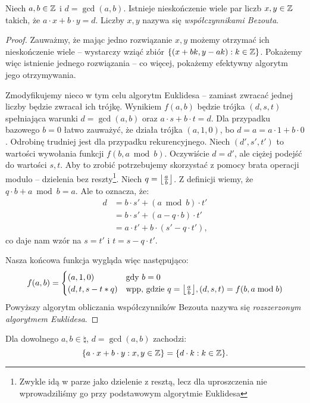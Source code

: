 \begin{theorem}
	\label{nt:bezout}
	Niech \(a, b \in \mathbb{Z}\) i \(d = \gcd(a, b)\). Istnieje nieskończenie
	wiele par liczb \(x, y \in \mathbb{Z}\) takich, że \(a \cdot x + b \cdot y = d\).
	Liczby \(x, y\) nazywa się \textit{współczynnikami Bezouta}.
\end{theorem}
\begin{proof}
	Zauważmy, że mając jedno rozwiązanie \(x, y\) możemy otrzymać ich nieskończenie wiele --
	wystarczy wziąć zbiór \(\set{(x+bk, y-ak) : k \in \integer}\). Pokażemy więc istnienie jednego
	rozwiązania -- co więcej, pokażemy efektywny algorytm jego otrzymywania.

	Zmodyfikujemy nieco w tym celu algorytm Euklidesa -- zamiast zwracać jednej liczby będzie zwracał ich trójkę.
	Wynikiem \(f(a, b)\) będzie trójka \((d, s, t)\) spełniająca warunki \(d = \gcd(a, b)\) oraz \(a \cdot s + b \cdot t = d\).
	Dla przypadku bazowego \(b = 0\) łatwo zauważyć, że działa trójka \((a, 1, 0)\), bo \(d = a = a \cdot 1 + b \cdot 0\).
	Odrobinę trudniej jest dla przypadku rekurencyjnego. Niech \((d', s', t')\) to wartości wywołania funkcji
	\(f(b, a \bmod b)\). Oczywiście \(d = d'\), ale ciężej podejść do wartości \(s, t\). Aby to zrobić potrzebujemy
	skorzystać z pomocy brata operacji modulo -- dzielenia bez reszty\footnote{Zwykle idą w parze jako dzielenie z resztą, lecz dla uproszczenia nie wprowadziliśmy go przy podstawowym algorytmie Euklidesa}.
	Niech \(q = \left\lfloor\frac{a}{b}\right\rfloor\). Z definicji wiemy, że \(q \cdot b + a \bmod b = a\). Ale to oznacza, że:
	\begin{align*}
		d & = b \cdot s' + (a \bmod b) \cdot t'       \\
		  & = b \cdot s' + (a - q \cdot b) \cdot t'   \\
		  & = a \cdot t' + b \cdot (s' - q \cdot t'),
	\end{align*}
	co daje nam wzór na \(s = t'\) i \(t = s - q \cdot t'\).

	Nasza końcowa funkcja wygląda więc następująco:
	\begin{equation*}
		f(a, b) = \begin{cases}
			(a, 1, 0)         & \text{gdy } b = 0                                                        \\
			(d, t, s - t * q) & \text {wpp, gdzie } q = \floor{\frac{a}{b}}, (d, s, t) = f(b, a \bmod b)
		\end{cases}
	\end{equation*}
	Powyższy algorytm obliczania współczynników Bezouta nazywa się \textit{rozszerzonym algorytmem Euklidesa}.
\end{proof}

\begin{corollary}
	Dla dowolnego \(a, b \in \natural\), \(d = \gcd(a, b)\) zachodzi:
	\begin{equation*}
		\set{a \cdot x + b \cdot y : x, y \in \integer} = \set{d \cdot k : k \in \integer}.
	\end{equation*}
\end{corollary}

